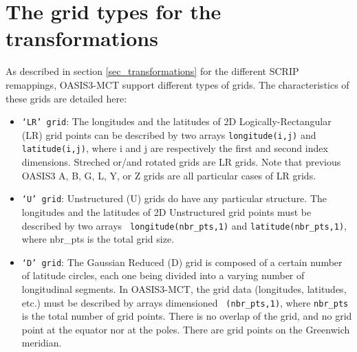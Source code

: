 \newpage
\chapter{The grid types for the transformations}
\label{subsec_gridtypes}

As described in section \ref{sec_transformations} for the different
SCRIP remappings, OASIS3-MCT support different types of grids. The
characteristics of these grids are detailed here:

\begin{itemize}

\item {\tt `LR' grid}: The longitudes and the latitudes of
  2D Logically-Rectangular (LR) grid points can be described by two arrays
  {\tt longitude(i,j)} and {\tt latitude(i,j)}, where i and j
  are respectively the first and second index dimensions. Streched
  or/and rotated grids are LR grids. Note that previous OASIS3 A, B, G, L, Y, or Z
  grids are all particular cases of LR grids.

\item {\tt `U' grid}: Unstructured (U) grids do have any particular
      structure. The longitudes and the latitudes of 2D Unstructured
      grid points must be described by two arrays {\tt
      longitude(nbr\_pts,1)} and {\tt latitude(nbr\_pts,1)}, where nbr\_pts
      is the total grid size.

\item {\tt `D' grid}: The Gaussian Reduced (D) grid is composed of a certain
number of latitude circles, each one being divided into a varying
number of longitudinal segments. In OASIS3-MCT, the grid data (longitudes,
latitudes, etc.) must be described by arrays dimensioned {\tt
(nbr\_pts,1)}, where {\tt nbr\_pts} is the total number of grid
points. There is no overlap of the grid, and no grid point at the
equator nor at the poles. There are grid points on the Greenwich
meridian.
 
\end{itemize}



